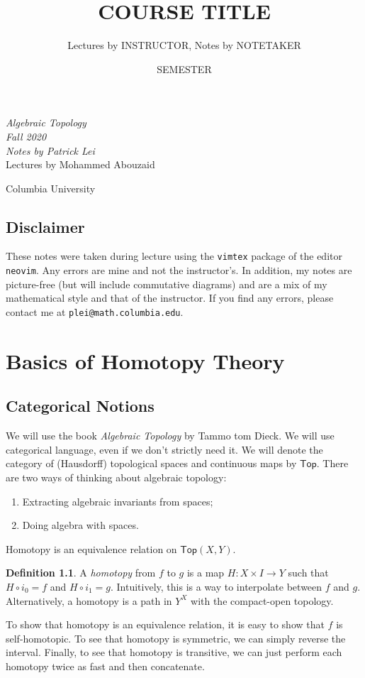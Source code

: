 \documentclass[leqno, openany]{memoir}
\title{COURSE TITLE}
\author{Lectures by INSTRUCTOR, Notes by NOTETAKER}
\date{SEMESTER}
\theoremstyle{definition}
\newtheorem{defn}[thm]{Definition}
\theoremstyle{remark}
\theoremstyle{plain}
\theoremstyle{definition}
\theoremstyle{remark}
\newcommand{\ms}[1]{\mathsf{#1}}
\newcommand*{\titleSW}
    {\begingroup%
    \raggedleft
    \vspace*{\baselineskip}
    {\Huge\itshape Algebraic Topology \\ Fall 2020}\\[\baselineskip]
    {\large\itshape Notes by Patrick Lei}\\[0.2\textheight]
    {\Large Lectures by Mohammed Abouzaid}\par
    \vfill
    {\Large \sffamily Columbia University}
    \vspace*{\baselineskip}
\endgroup}
\begin{document}
    
\begin{titlingpage}
\titleSW
\end{titlingpage}

\thispagestyle{empty}
\section*{Disclaimer}%
\label{sec:disclaimer}

These notes were taken during lecture using the \texttt{vimtex} package of the
editor \texttt{neovim}.  Any errors are mine and not the instructor's.  In
addition, my notes are picture-free (but will include commutative diagrams) and
are a mix of my mathematical style and that of the instructor.  If you find any
errors, please contact me at \texttt{plei@math.columbia.edu}.  \newpage


\tableofcontents

\chapter{Basics of Homotopy Theory}%

\section{Categorical Notions}%

We will use the book \textit{Algebraic Topology} by Tammo tom Dieck. We will
use categorical language, even if we don't strictly need it. We will denote the
category of (Hausdorff) topological spaces and continuous maps by $\ms{Top}$.
There are two ways of thinking about algebraic topology: \begin{enumerate}
\item Extracting algebraic invariants from spaces; \item Doing algebra with
spaces.  \end{enumerate}

Homotopy is an equivalence relation on $\ms{Top}(X,Y)$. 

\begin{defn} A \textit{homotopy} from $f$ to $g$ is a map $H: X \times I \to Y$
    such that $H \circ i_0 = f$ and $H \circ i_1 = g$. Intuitively, this is a
    way to interpolate between $f$ and $g$. Alternatively, a homotopy is a path
    in $Y^X$ with the compact-open topology.  \end{defn} 

To show that homotopy is an equivalence relation, it is easy to show that $f$
is self-homotopic. To see that homotopy is symmetric, we can simply reverse the
interval. Finally, to see that homotopy is transitive, we can just perform each
homotopy twice as fast and then concatenate.
\end{document}
